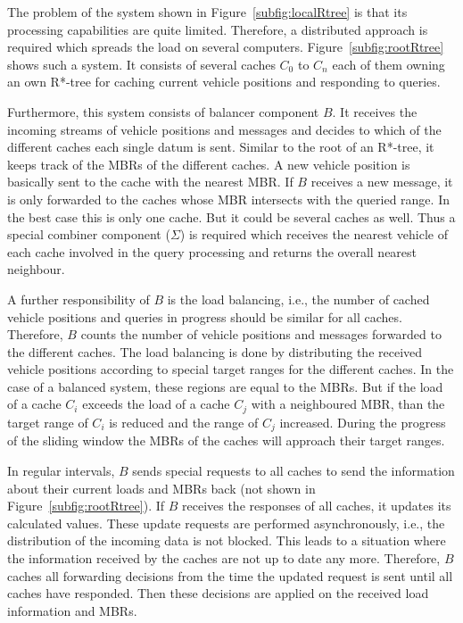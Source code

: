 The problem of the system shown in Figure~\ref{subfig:localRtree} is that its processing capabilities are quite limited. Therefore, a distributed approach is required which spreads the load on several computers. Figure~\ref{subfig:rootRtree} shows such a system. It consists of several caches $C_0$ to $C_n$ each of them owning an own R*-tree for caching current vehicle positions and responding to queries.

Furthermore, this system consists of balancer component $B$. It receives the incoming streams of vehicle positions and messages and decides to which of the different caches each single datum is sent. Similar to the root of an R*-tree, it keeps track of the MBRs of the different caches. A new vehicle position is basically sent to the cache with the nearest MBR. If $B$ receives a new message, it is only forwarded to the caches whose MBR intersects with the queried range. In the best case this is only one cache. But it could be several caches as well. Thus a special combiner component ($\Sigma$) is required which receives the nearest vehicle of each cache involved in the query processing and returns the overall nearest neighbour.

A further responsibility of $B$ is the load balancing, i.e., the number of cached vehicle positions and queries in progress should be similar for all caches. Therefore, $B$ counts the number of vehicle positions and messages forwarded to the different caches. The load balancing is done by distributing the received vehicle positions according to special target ranges for the different caches. In the case of a balanced system, these regions are equal to the MBRs. But if the load of a cache $C_i$ exceeds the load of a cache $C_j$ with a neighboured MBR, than the target range of $C_i$ is reduced and the range of $C_j$ increased. During the progress of the sliding window the MBRs of the caches will approach their target ranges.

In regular intervals, $B$ sends special requests to all caches to send the information about their current loads and MBRs back (not shown in Figure~\ref{subfig:rootRtree}). If $B$ receives the responses of all caches, it updates its calculated values. These update requests are performed asynchronously, i.e., the distribution of the incoming data is not blocked. This leads to a situation where the information received by the caches are not up to date any more. Therefore, $B$ caches all forwarding decisions from the time the updated request is sent until all caches have responded. Then these decisions are applied on the received load information and MBRs.

